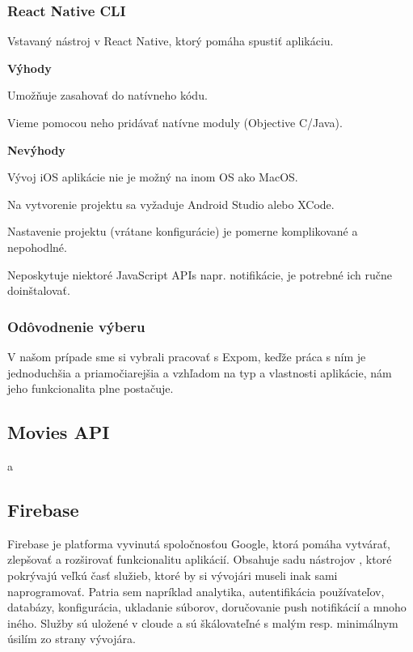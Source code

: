 \subsubsection{React Native CLI}
Vstavaný nástroj v React Native, ktorý pomáha spustiť aplikáciu. \newline

{\bf Výhody}
\begin{itemize}
{\item Umožňuje zasahovať do natívneho kódu.} 
{\item Vieme pomocou neho pridávať natívne moduly (Objective C/Java).} 
\end{itemize}

{\bf Nevýhody}
\begin{itemize}
{\item Vývoj iOS aplikácie nie je možný na inom OS ako MacOS.} 
{\item Na vytvorenie projektu sa vyžaduje Android Studio alebo XCode.}
{\item Nastavenie projektu (vrátane konfigurácie) je pomerne komplikované a nepohodlné.} 
{\item Neposkytuje niektoré JavaScript APIs napr. notifikácie, je potrebné ich ručne doinštalovať.}
\end{itemize}

\subsubsection{Odôvodnenie výberu}
V našom prípade sme si vybrali pracovať s Expom, keďže práca s ním je jednoduchšia a priamočiarejšia a vzhľadom na typ a vlastnosti aplikácie, nám jeho funkcionalita plne postačuje.

\subsection{Movies API}
a

\subsection{Firebase}
Firebase je platforma vyvinutá spoločnosťou Google, ktorá pomáha vytvárať, zlepšovať a rozširovať funkcionalitu aplikácií. Obsahuje sadu nástrojov , ktoré pokrývajú veľkú časť služieb, ktoré by si vývojári museli inak sami naprogramovať. Patria sem napríklad analytika, autentifikácia používateľov, databázy, konfigurácia, ukladanie súborov, doručovanie push notifikácií a mnoho iného. Služby sú uložené v cloude a sú škálovateľné s malým resp. minimálnym úsilím zo strany vývojára.
